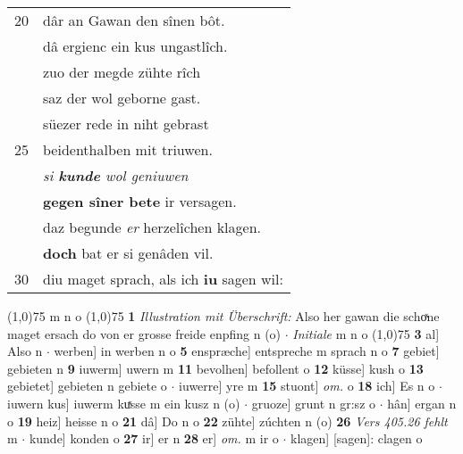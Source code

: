 \documentclass[8pt,a4paper,notitlepage]{article}
\begin{document}
\begin{table}[ht]
\begin{minipage}[t]{0.5\linewidth}
\begin{tabular}{rl}
20 & dâr an Gawan den sînen bôt.\\ 
 & dâ ergienc ein kus ungastlîch.\\ 
 & zuo der megde zühte rîch\\ 
 & saz der wol geborne gast.\\ 
 & süezer rede in niht gebrast\\ 
25 & beidenthalben mit triuwen.\\ 
 & \textit{si \textbf{kunde} wol geniuwen}\\ 
 & \textbf{gegen sîner bete} ir versagen.\\ 
 & daz begunde \textit{er} herzelîchen klagen.\\ 
 & \textbf{doch} bat er si genâden vil.\\ 
30 & diu maget sprach, als ich \textbf{iu} sagen wil:\\ 
\end{tabular}
\scriptsize
\line(1,0){75} \newline
m n o \newline
\line(1,0){75} \newline
\textbf{1} \textit{Illustration mit Überschrift:} Also her gawan die schoͯne maget ersach do von er grosse freide enpfing n (o)   $\cdot$ \textit{Initiale} m n o  \newline
\line(1,0){75} \newline
\textbf{3} al] Also n  $\cdot$ werben] in werben n o \textbf{5} enspræche] entspreche m sprach n o \textbf{7} gebiet] gebieten n \textbf{9} iuwerm] uwern m \textbf{11} bevolhen] befollent o \textbf{12} küsse] kush o \textbf{13} gebietet] gebieten n gebiete o  $\cdot$ iuwerre] yre m \textbf{15} stuont] \textit{om.} o \textbf{18} ich] Es n o  $\cdot$ iuwern kus] iuwerm kuͯsse m ein kusz n (o)  $\cdot$ gruoze] grunt n gr:sz o  $\cdot$ hân] ergan n o \textbf{19} heiz] heisse n o \textbf{21} dâ] Do n o \textbf{22} zühte] zúchten n (o) \textbf{26} \textit{Vers 405.26 fehlt} m   $\cdot$ kunde] konden o \textbf{27} ir] er n \textbf{28} er] \textit{om.} m ir o  $\cdot$ klagen] [sagen]: clagen o \newline
\end{minipage}
\end{table}
\newpage
\end{document}
